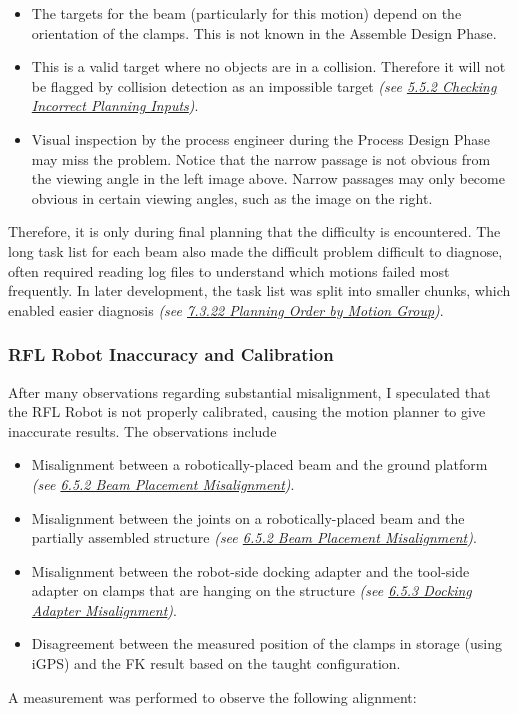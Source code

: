 \documentclass[11pt]{book}
\begin{document}
\begin{itemize}
	\item The targets for the beam (particularly for this motion) depend on the orientation of the clamps. This is not known in the Assemble Design Phase.

	\item This is a valid target where no objects are in a collision. Therefore it will not be flagged by collision detection as an impossible target \textit{\textcolor[HTML]{B7B7B7}{(see \uline{5.5.2 Checking Incorrect Planning Inputs})}}.

	\item Visual inspection by the process engineer during the Process Design Phase may miss the problem. Notice that the narrow passage is not obvious from the viewing angle in the left image above. Narrow passages may only become obvious in certain viewing angles, such as the image on the right.

\end{itemize}
Therefore, it is only during final planning that the difficulty is encountered. The long task list for each beam also made the difficult problem difficult to diagnose, often required reading log files to understand which motions failed most frequently. In later development, the task list was split into smaller chunks, which enabled easier diagnosis \textit{\textcolor[HTML]{B7B7B7}{(see \uline{7.3.22 Planning Order by Motion Group})}}. 

\subsubsection{RFL Robot Inaccuracy and Calibration}

After many observations regarding substantial misalignment, I speculated that the RFL Robot is not properly calibrated, causing the motion planner to give inaccurate results. The observations include

\begin{itemize}
	\item Misalignment between a robotically-placed beam and the ground platform \textit{\textcolor[HTML]{B7B7B7}{(see \uline{6.5.2 Beam Placement Misalignment})}}.

	\item Misalignment between the joints on a robotically-placed beam and the partially assembled structure \textit{\textcolor[HTML]{B7B7B7}{(see \uline{6.5.2 Beam Placement Misalignment})}}.

	\item Misalignment between the robot-side docking adapter and the tool-side adapter on clamps that are hanging on the structure \textit{\textcolor[HTML]{B7B7B7}{(see \uline{6.5.3 Docking Adapter Misalignment})}}.

	\item Disagreement between the measured position of the clamps in storage (using iGPS) and the FK result based on the taught configuration.

\end{itemize}
A measurement was performed to observe the following alignment:
\end{document}
